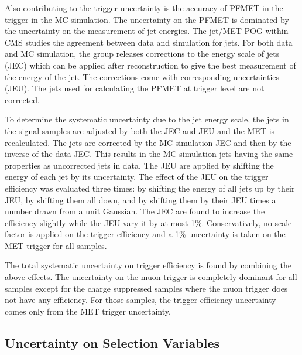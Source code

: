 Also contributing to the trigger uncertainty is the accuracy of PFMET in the trigger in the MC simulation. The uncertainty on the PFMET is dominated by the uncertainty on
the measurement of jet energies. The jet/MET POG within CMS studies the agreement between data and simulation for jets. For both data and MC simulation,
the group releases corrections to the energy scale of jets (JEC) which can be applied after reconstruction to give the best measurement of the energy of the jet. The corrections
come with corresponding uncertainties (JEU). The jets used for calculating the PFMET at trigger level are not corrected.

To determine the systematic uncertainty due to the jet energy scale, the jets in the signal samples are adjusted by both the JEC and JEU and the MET is recalculated.
The jets are corrected by the MC simulation JEC and then by the inverse of the data JEC.
This results in the MC simulation jets having the same properties as uncorrected jets in data.
The JEU are applied by shifting the energy of each jet by its uncertainty.
The effect of the JEU on the trigger efficiency was evaluated three times: by shifting the energy of all jets up by their JEU,
by shifting them all down, and by shifting them by their JEU times a number drawn from a unit Gaussian.
The JEC are found to increase the efficiency slightly while the JEU vary it by at most 1\%.
Conservatively, no scale factor is applied on the trigger efficiency and a 1\% uncertainty is taken on the MET trigger for all samples.

The total systematic uncertainty on trigger efficiency is found by combining the above effects. 
The uncertainty on the muon trigger is completely dominant for all samples except for the charge suppressed samples where the muon trigger does not have any efficiency.
For those samples, the trigger efficiency uncertainty comes only from the MET trigger uncertainty.


\subsection{Uncertainty on Selection Variables}

